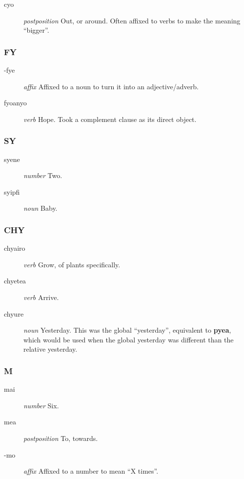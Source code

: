 \documentclass{article}
\begin{document}
\begin{description}
\item [cyo] \emph{postposition} Out, or around.  Often affixed to verbs to make the meaning ``bigger''.
\end{description}

\subsubsection{FY}

\begin{description}
\item [-fye] \emph{affix} Affixed to a noun to turn it into an adjective/adverb.
\item [fyoanyo] \emph{verb} Hope.  Took a complement clause as its direct object.
\end{description}

\subsubsection{SY}

\begin{description}
\item [syene] \emph{number} Two.
\item [syipfi] \emph{noun} Baby.
\end{description}

\subsubsection{CHY}

\begin{description}
\item [chyairo] \emph{verb} Grow, of plants specifically.
\item [chyetea] \emph{verb} Arrive.
\item [chyure] \emph{noun} Yesterday.  This was the global ``yesterday'', equivalent to \textbf{pyea}, which would be used when the global yesterday was different than the relative yesterday.
\end{description}

\subsubsection{M}

\begin{description}
\item [mai] \emph{number} Six.
\item [mea] \emph{postposition} To, towards.
\item [-mo] \emph{affix} Affixed to a number to mean ``X times''.
\end{description}
\end{document}
